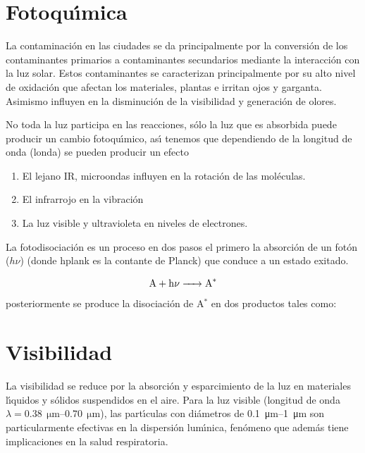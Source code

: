 \section{Fotoqu\'{\i}mica}\label{fqm}

La contaminaci\'on en las ciudades se da principalmente por la conversi\'on de los contaminantes primarios a contaminantes secundarios mediante la interacci\'on con la luz solar. Estos contaminantes se caracterizan principalmente por su alto nivel de oxidaci\'on que afectan los materiales, plantas e irritan ojos y garganta. Asimismo influyen en la disminuci\'on de la visibilidad y generaci\'on de olores.

No toda la luz participa en las reacciones, s\'olo la luz que es absorbida puede producir un cambio fotoqu\'{\i}mico, as\'{\i} tenemos que dependiendo de la longitud de onda (\gls{londa}) se pueden producir un efecto
\begin{enumerate}
\item El lejano \gls{IR}, microondas influyen en la rotaci\'on de las mol\'eculas.
\item El infrarrojo en la vibraci\'on
\item La luz visible y ultravioleta en niveles de electrones.
\end{enumerate}

La fotodisociaci\'on es un proceso en dos pasos el primero la absorci\'on de un fot\'on ($h\nu$) (donde  \gls{hplank}  es la contante de Planck) que conduce a un estado exitado.

 \begin{equation*}
\ce{A + h{\nu}    -> A^* } \end{equation*}
posteriormente se produce la disociaci\'on de A$^*$ en dos productos tales como:
 

\section{Visibilidad}\label{vis2}

La visibilidad se reduce por la absorci\'on y esparcimiento de la luz en materiales l\'{\i}quidos y s\'olidos suspendidos en el aire. Para la luz visible (longitud de onda $\lambda = \SIrange{0.38}{0.70}{\ \micro\metre}$), las part\'{\i}culas con di\'ametros de \SIrange{0.1}{1}{\micro\metre} son particularmente efectivas en la dispersi\'on lum\'{\i}nica, fen\'omeno que adem\'as tiene implicaciones en la salud respiratoria.


